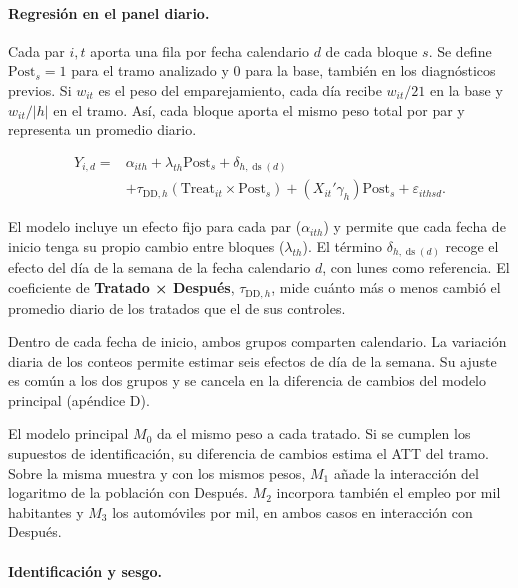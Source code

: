 \documentclass[11pt,letterpaper]{article}
\begin{document}

\paragraph{Regresión en el panel diario.}

Cada par $i,t$ aporta una fila por fecha calendario $d$ de cada bloque $s$. Se define $\mathrm{Post}_s=1$ para el tramo analizado y $0$ para la base, también en los diagnósticos previos. Si $w_{it}$ es el peso del emparejamiento, cada día recibe $w_{it}/21$ en la base y $w_{it}/|h|$ en el tramo. Así, cada bloque aporta el mismo peso total por par y representa un promedio diario.\par

\[
\begin{aligned}
Y_{i,d}={}&\alpha_{ith}+\lambda_{th}\mathrm{Post}_s
  +\delta_{h,\operatorname{ds}(d)}\\
 &+\tau_{\mathrm{DD},h}(\mathrm{Treat}_{it}\times\mathrm{Post}_s)
  +(X_{it}'\gamma_h)\mathrm{Post}_s+\varepsilon_{ithsd}.
\end{aligned}
\]

El modelo incluye un efecto fijo para cada par ($\alpha_{ith}$) y permite que cada fecha de inicio tenga su propio cambio entre bloques ($\lambda_{th}$). El término $\delta_{h,\operatorname{ds}(d)}$ recoge el efecto del día de la semana de la fecha calendario $d$, con lunes como referencia. El coeficiente de \textbf{Tratado × Después}, $\tau_{\mathrm{DD},h}$, mide cuánto más o menos cambió el promedio diario de los tratados que el de sus controles.\par

Dentro de cada fecha de inicio, ambos grupos comparten calendario. La variación diaria de los conteos permite estimar seis efectos de día de la semana. Su ajuste es común a los dos grupos y se cancela en la diferencia de cambios del modelo principal (apéndice D).\par

El modelo principal $M_0$ da el mismo peso a cada tratado. Si se cumplen los supuestos de identificación, su diferencia de cambios estima el ATT del tramo. Sobre la misma muestra y con los mismos pesos, $M_1$ añade la interacción del logaritmo de la población con Después. $M_2$ incorpora también el empleo por mil habitantes y $M_3$ los automóviles por mil, en ambos casos en interacción con Después.\par

\paragraph{Identificación y sesgo.}
\end{document}
